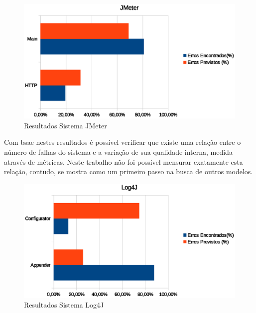 \documentclass[12pt]{article}
\begin{document}
\begin{figure}[htbp]
\centering
\includegraphics[width=.80\textwidth]{../img/graph_jmeter.eps}
\caption{Resultados Sistema JMeter}
\label{fig:avalicao_jmeter}
\end{figure}

Com bsae nestes resultados é possível verificar que existe uma relação entre o
número de falhas do sistema e a variação de sua qualidade interna, medida
através de métricas. Neste trabalho não foi possível mensurar exatamente esta
relação, contudo, se mostra como um primeiro passo na busca de outros modelos.

\begin{figure}[htbp]
\centering
\includegraphics[width=.80\textwidth]{../img/graph_log4j.eps}
\caption{Resultados Sistema Log4J}
\label{fig:avalicao_log4j}
\end{figure}
\end{document}

